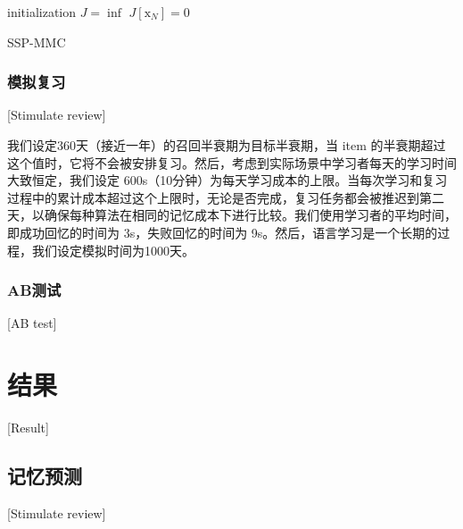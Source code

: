 \begin{algorithm}[htbp]
    initialization\;
    $J = \inf$\;
    $J[\boldsymbol{\mathrm{x}}_{N}] = 0$\;
\caption{SSP-MMC}
\label{alg:ssp_mmc}
\end{algorithm}

\subsection{模拟复习}[Stimulate review]

我们设定360天（接近一年）的召回半衰期为目标半衰期，当 item 的半衰期超过这个值时，它将不会被安排复习。然后，考虑到实际场景中学习者每天的学习时间大致恒定，我们设定 600s（10分钟）为每天学习成本的上限。当每次学习和复习过程中的累计成本超过这个上限时，无论是否完成，复习任务都会被推迟到第二天，以确保每种算法在相同的记忆成本下进行比较。我们使用学习者的平均时间，即成功回忆的时间为 3s，失败回忆的时间为 9s。然后，语言学习是一个长期的过程，我们设定模拟时间为1000天。

\subsection{AB测试}[AB test]

\chapter{结果}[Result]

\section{记忆预测}[Stimulate review]


